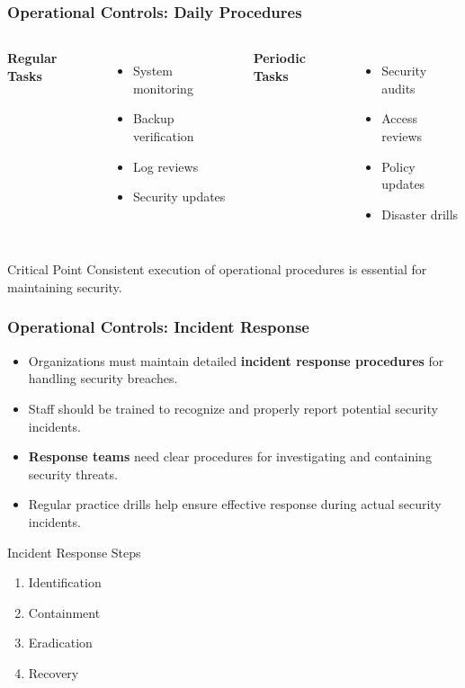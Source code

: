\documentclass{beamer}
\begin{document}
\begin{frame}
    \frametitle{Operational Controls: Daily Procedures}
    
    \begin{columns}[t]
        \textbf{Regular Tasks}
        \begin{itemize}
            \item System monitoring
            \item Backup verification
            \item Log reviews
            \item Security updates
        \end{itemize}
        
        \textbf{Periodic Tasks}
        \begin{itemize}
            \item Security audits
            \item Access reviews
            \item Policy updates
            \item Disaster drills
        \end{itemize}
    \end{columns}
    
    \begin{alertblock}{Critical Point}
        Consistent execution of operational procedures is essential for maintaining security.
    \end{alertblock}
\end{frame}

\begin{frame}
    \frametitle{Operational Controls: Incident Response}
    
    \begin{itemize}
        \item Organizations must maintain detailed \textbf{incident response procedures} for handling security breaches.
        
        \item Staff should be trained to recognize and properly report potential security incidents.
        
        \item \textbf{Response teams} need clear procedures for investigating and containing security threats.
        
        \item Regular practice drills help ensure effective response during actual security incidents.
    \end{itemize}
    
    \begin{block}{Incident Response Steps}
        \begin{enumerate}
            \item Identification
            \item Containment
            \item Eradication
            \item Recovery
        \end{enumerate}
    \end{block}
\end{frame}
\end{document}

